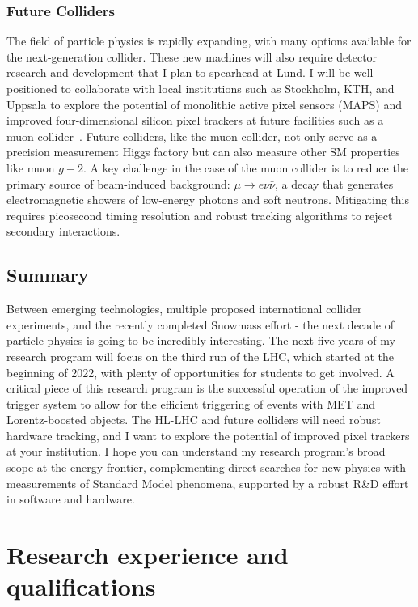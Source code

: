 \subsubsection{Future Colliders} \label{sssec:future-colliders}
The field of particle physics is rapidly expanding, with many options available for the next-generation collider. These new machines will also require detector research and development that I plan to spearhead at Lund. I will be well-positioned to collaborate with local institutions such as Stockholm, KTH, and Uppsala to explore the potential of monolithic active pixel sensors (MAPS) and improved four-dimensional silicon pixel trackers at future facilities such as a muon collider~. %
Future colliders, like the muon collider, not only serve as a precision measurement Higgs factory but can also measure other SM properties like muon $g-2$. %
A key challenge in the case of the muon collider is to reduce the primary source of beam-induced background: $\mu \to e \nu \bar{\nu}$, a decay that generates electromagnetic showers of low-energy photons and soft neutrons. Mitigating this requires picosecond timing resolution and robust tracking algorithms to reject secondary interactions.

\subsection{Summary} \label{ssec:summary}
Between emerging technologies, multiple proposed international collider experiments, and the recently completed Snowmass effort - the next decade of particle physics is going to be incredibly interesting. The next five years of my research program will focus on the third run of the LHC, which started at the beginning of 2022, with plenty of opportunities for students to get involved. A critical piece of this research program is the successful operation of the improved trigger system to allow for the efficient triggering of events with MET and Lorentz-boosted objects. The HL-LHC and future colliders will need robust hardware tracking, and I want to explore the potential of improved pixel trackers at your institution.  I hope you can understand my research program's broad scope at the energy frontier, complementing direct searches for new physics with measurements of Standard Model phenomena, supported by a robust R\&D effort in software and hardware.

\section{Research experience and qualifications} \label{sec:research-experience-and-qualifications}

